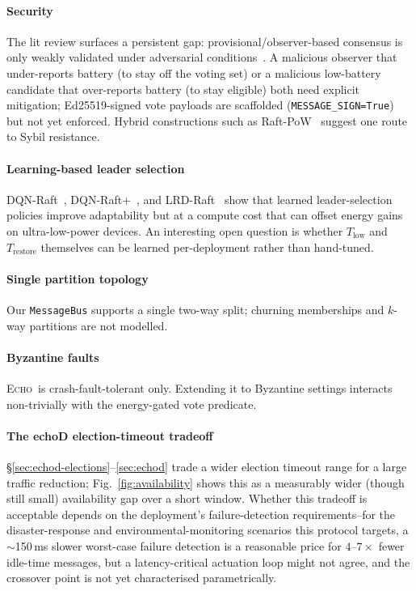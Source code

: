 \documentclass[conference]{IEEEtran}
\newcommand{\echoproto}{\textsc{Echo}\xspace}
\begin{document}
\paragraph{Security}
The lit review surfaces a persistent gap: provisional/observer-based
consensus is only weakly validated under adversarial
conditions~\cite{wang2025dqnraftplus}. A malicious observer that
under-reports battery (to stay off the voting set) or a malicious
low-battery candidate that over-reports battery (to stay eligible)
both need explicit mitigation; Ed25519-signed vote payloads are
scaffolded (\texttt{MESSAGE\_SIGN=True}) but not yet enforced.
Hybrid constructions such as Raft-PoW~\cite{ulukok2025hybridraftpow}
suggest one route to Sybil resistance.

\paragraph{Learning-based leader selection}
DQN-Raft~\cite{liu2022dqnraft}, DQN-Raft+~\cite{wang2025dqnraftplus},
and LRD-Raft~\cite{yang2025lrdraft} show that learned leader-selection
policies improve adaptability but at a compute cost that can offset
energy gains on ultra-low-power devices. An interesting open question
is whether $T_{\text{low}}$ and $T_{\text{restore}}$ themselves can be
learned per-deployment rather than hand-tuned.

\paragraph{Single partition topology}
Our \texttt{MessageBus} supports a single two-way split; churning
memberships and $k$-way partitions are not modelled.

\paragraph{Byzantine faults}
\echoproto\ is crash-fault-tolerant only. Extending it to Byzantine
settings interacts non-trivially with the energy-gated vote predicate.

\paragraph{The echoD election-timeout tradeoff}
\S\ref{sec:echod-elections}--\ref{sec:echod} trade a wider election
timeout range for a large traffic reduction; Fig.~\ref{fig:availability}
shows this as a measurably wider (though still small) availability gap
over a short window. Whether this tradeoff is acceptable depends on the
deployment's failure-detection requirements--for the disaster-response
and environmental-monitoring scenarios this protocol targets, a
$\sim$150\,ms slower worst-case failure detection is a reasonable price
for $4$--$7\times$ fewer idle-time messages, but a latency-critical
actuation loop might not agree, and the crossover point is not yet
characterised parametrically.
\end{document}

